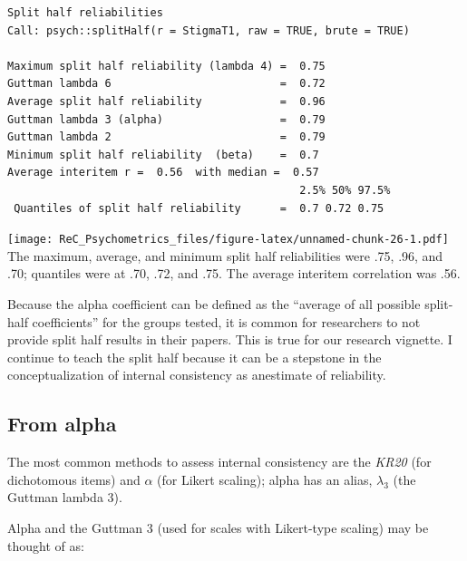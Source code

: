 \documentclass[
  english,
]{book}
\newenvironment{Shaded}{\begin{snugshade}}{\end{snugshade}}
\newcommand{\AttributeTok}[1]{\textcolor[rgb]{0.77,0.63,0.00}{#1}}
\newcommand{\DecValTok}[1]{\textcolor[rgb]{0.00,0.00,0.81}{#1}}
\newcommand{\FunctionTok}[1]{\textcolor[rgb]{0.00,0.00,0.00}{#1}}
\newcommand{\NormalTok}[1]{#1}
\newcommand{\SpecialCharTok}[1]{\textcolor[rgb]{0.00,0.00,0.00}{#1}}
\newcommand{\StringTok}[1]{\textcolor[rgb]{0.31,0.60,0.02}{#1}}
\begin{document}
\begin{verbatim}
Split half reliabilities  
Call: psych::splitHalf(r = StigmaT1, raw = TRUE, brute = TRUE)

Maximum split half reliability (lambda 4) =  0.75
Guttman lambda 6                          =  0.72
Average split half reliability            =  0.96
Guttman lambda 3 (alpha)                  =  0.79
Guttman lambda 2                          =  0.79
Minimum split half reliability  (beta)    =  0.7
Average interitem r =  0.56  with median =  0.57
                                             2.5% 50% 97.5%
 Quantiles of split half reliability      =  0.7 0.72 0.75
\end{verbatim}

\begin{Shaded}
\end{Shaded}

\texttt{[image: ReC\_Psychometrics\_files/figure-latex/unnamed-chunk-26-1.pdf]}
The maximum, average, and minimum split half reliabilities were .75, .96, and .70; quantiles were at .70, .72, and .75. The average interitem correlation was .56.

Because the alpha coefficient can be defined as the ``average of all possible split-half coefficients'' for the groups tested, it is common for researchers to not provide split half results in their papers. This is true for our research vignette. I continue to teach the split half because it can be a stepstone in the conceptualization of internal consistency as anestimate of reliability.

\hypertarget{from-alpha}{%
\subsection{From alpha}\label{from-alpha}}

The most common methods to assess internal consistency are the \emph{KR20} (for dichotomous items) and \(\alpha\) (for Likert scaling); alpha has an alias, \(\lambda _{3}\) (the Guttman lambda 3).

Alpha and the Guttman 3 (used for scales with Likert-type scaling) may be thought of as:
\end{document}
